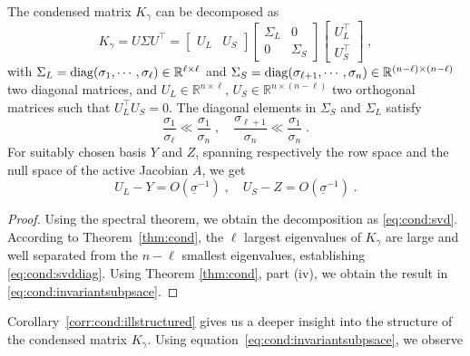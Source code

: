 \begin{corollary}
  \label{corr:cond:illstructured}
  The condensed matrix $K_\gamma$ can be decomposed as
  \begin{equation}
    \label{eq:cond:svd}
    K_\gamma = U \Sigma U^\top = \begin{bmatrix} U_L & U_S \end{bmatrix}
    \begin{bmatrix}
      \Sigma_L & 0 \\ 0 & \Sigma_S
    \end{bmatrix}
    \begin{bmatrix}
      U_L^\top \\ U_S^\top
    \end{bmatrix}
    \; ,
  \end{equation}
  with $\Sigma_L = \operatorname{diag}(\sigma_1, \cdots, \sigma_\ell) \in \mathbb{R}^{\ell \times \ell}$ and $\Sigma_S  = \operatorname{diag}(\sigma_{\ell+1}, \cdots, \sigma_n)\in \mathbb{R}^{(n-\ell) \times (n-\ell)}$
  two diagonal matrices, and $U_L \in \mathbb{R}^{n \times \ell}$,
  $U_S \in \mathbb{R}^{n \times (n - \ell)}$ two
  orthogonal matrices such that $U_L^\top U_S = 0$.
  The diagonal elements in $\Sigma_S$ and $\Sigma_L$ satisfy
  \begin{equation}
    \label{eq:cond:svddiag}
    \frac{\sigma_1}{\sigma_\ell} \ll \frac{\sigma_1}{\sigma_n} \; , \quad
    \frac{\sigma_{\ell +1}}{\sigma_{n}} \ll \frac{\sigma_1}{\sigma_n} \; .
  \end{equation}
  For suitably chosen basis $Y$ and $Z$,
  spanning respectively the row space and the null space of
  the active Jacobian $A$, we get
  \begin{equation}
    \label{eq:cond:invariantsubpsace}
    U_L - Y = O(\underline{\sigma}^{-1}) \; , \quad
    U_S - Z = O(\underline{\sigma}^{-1}) \; .
  \end{equation}
\end{corollary}
\begin{proof}
  Using the spectral theorem, we obtain the decomposition as \eqref{eq:cond:svd}.
  According to Theorem~\ref{thm:cond}, the $\ell$ largest eigenvalues of $K_\gamma$ are large
  and well separated from the $n - \ell$ smallest eigenvalues,
  establishing \eqref{eq:cond:svddiag}.
  Using Theorem \ref{thm:cond}, part (iv), we obtain the result
  in \eqref{eq:cond:invariantsubpsace}.
\end{proof}
Corollary~\ref{corr:cond:illstructured} gives us a deeper insight into the structure
of the condensed matrix $K_\gamma$.
Using equation~\eqref{eq:cond:invariantsubpsace}, we observe
